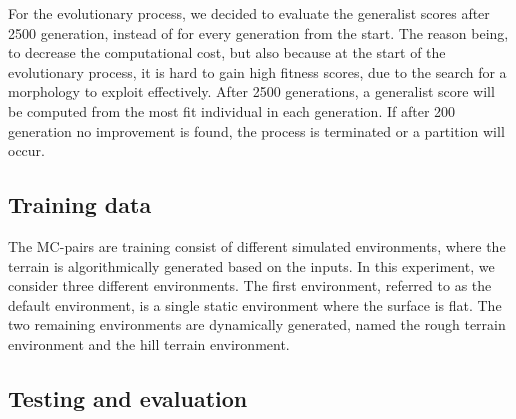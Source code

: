         For the evolutionary process, we decided to evaluate the generalist scores after 2500 generation, instead of for every generation from the start. The reason being, to decrease the computational cost, but also because at the start of the evolutionary process, it is hard to gain high fitness scores, due to the search for a morphology to exploit effectively. After 2500 generations, a generalist score will be computed from the most fit individual in each generation. If after 200 generation no improvement is found, the process is terminated or a partition will occur.
    \subsection{Training data}
        The MC-pairs are training consist of different simulated environments, where the terrain is algorithmically generated based on the inputs. In this experiment, we consider three different environments. The first environment, referred to as the default environment, is a single static environment where the surface is flat. The two remaining environments are dynamically generated, named the rough terrain environment and the hill terrain environment. 
    \subsection{Testing and evaluation}